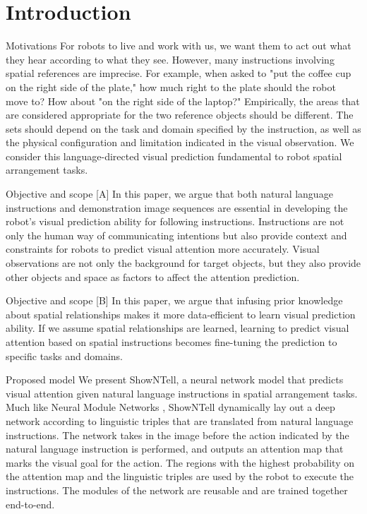 \documentclass[conference]{IEEEtran}
\newenvironment{statement1}%
  {\begin{mdframed}[backgroundcolor=lightcyan,
  					topline=false,
  					rightline=false,
  					leftline=false,
  					bottomline=false
  					]\smallskip}%
  {\smallskip\end{mdframed}}
\newenvironment{statement2}%
  {\begin{mdframed}[backgroundcolor=lightyellow,
  					topline=false,
  					rightline=false,
  					leftline=false,
  					bottomline=false
  					]\smallskip}%
  {\smallskip\end{mdframed}}
\begin{document}

\section{Introduction}

\color{red} Motivations \color{black} For robots to live and work with us, we want them to act out what they hear according to what they see. However, many instructions involving spatial references are imprecise. For example, when asked to "put the coffee cup on the right side of the plate," how much right to the plate should the robot move to? How about "on the right side of the laptop?" Empirically, the areas that are considered appropriate for the two reference objects should be different. The sets should depend on the task and domain specified by the instruction, as well as the physical configuration and limitation indicated in the visual observation. We consider this language-directed visual prediction fundamental to robot spatial arrangement tasks.

\begin{statement1}
\color{red} Objective and scope [A] \color{black} In this paper, we argue that both natural language instructions and demonstration image sequences are essential in developing the robot's visual prediction ability for following instructions. Instructions are not only the human way of communicating intentions but also provide context and constraints for robots to predict visual attention more accurately. Visual observations are not only the background for target objects, but they also provide other objects and space as factors to affect the attention prediction.
\end{statement1}

\begin{statement2}
\color{red} Objective and scope [B] \color{black} In this paper, we argue that infusing prior knowledge about spatial relationships makes it more data-efficient to learn visual prediction ability. If we assume spatial relationships are learned, learning to predict visual attention based on spatial instructions becomes fine-tuning the prediction to specific tasks and domains.
\end{statement2}

\color{red} Proposed model \color{black} We present ShowNTell, a neural network model that predicts visual attention given natural language instructions in spatial arrangement tasks. Much like Neural Module Networks \cite{andreas2016neural}, ShowNTell dynamically lay out a deep network according to linguistic triples that are translated from natural language instructions. The network takes in the image before the action indicated by the natural language instruction is performed, and outputs an attention map that marks the visual goal for the action. The regions with the highest probability on the attention map and the linguistic triples are used by the robot to execute the instructions. The modules of the network are reusable and are trained together end-to-end. 
\end{document}

